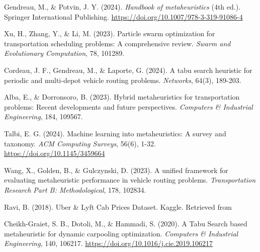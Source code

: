 \documentclass[conference]{IEEEtran}
\begin{document}
\begin{thebibliography}{26}
 Gendreau, M., \& Potvin, J. Y. (2024). \textit{Handbook of metaheuristics} (4th ed.). Springer International Publishing. \url{https://doi.org/10.1007/978-3-319-91086-4}

 Xu, H., Zhang, Y., \& Li, M. (2023). Particle swarm optimization for transportation scheduling problems: A comprehensive review. \textit{Swarm and Evolutionary Computation}, 78, 101289.

 Cordeau, J. F., Gendreau, M., \& Laporte, G. (2024). A tabu search heuristic for periodic and multi-depot vehicle routing problems. \textit{Networks}, 64(3), 189-203.

 Alba, E., \& Dorronsoro, B. (2023). Hybrid metaheuristics for transportation problems: Recent developments and future perspectives. \textit{Computers \& Industrial Engineering}, 184, 109567.

 Talbi, E. G. (2024). Machine learning into metaheuristics: A survey and taxonomy. \textit{ACM Computing Surveys}, 56(6), 1-32. \url{https://doi.org/10.1145/3459664}

 Wang, X., Golden, B., \& Gulczynski, D. (2023). A unified framework for evaluating metaheuristic performance in vehicle routing problems. \textit{Transportation Research Part B: Methodological}, 178, 102834.

 Ravi, B. (2018). Uber \& Lyft Cab Prices Dataset. Kaggle. Retrieved from

 Cheikh-Graiet, S. B., Dotoli, M., \& Hammadi, S. (2020). A Tabu Search based metaheuristic for dynamic carpooling optimization. \textit{Computers \& Industrial Engineering}, 140, 106217. \url{https://doi.org/10.1016/j.cie.2019.106217}

\end{thebibliography}
\end{document}
